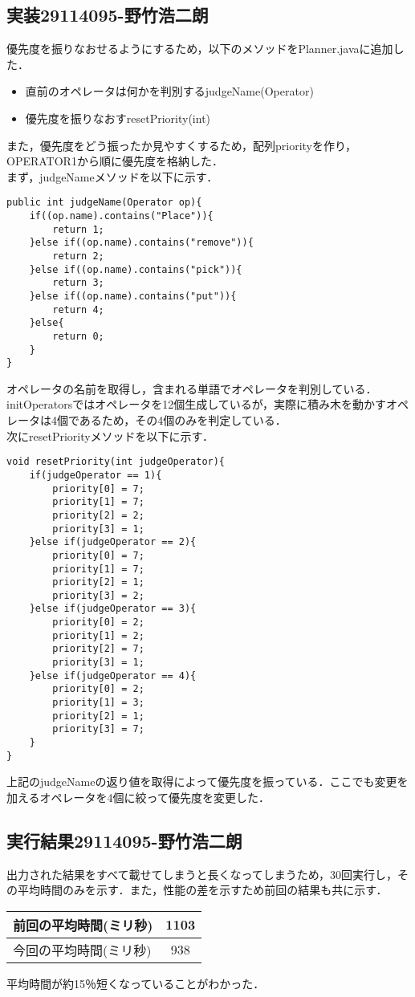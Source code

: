 \documentclass{jarticle}
\begin{document}
\subsection{実装29114095-野竹浩二朗}
優先度を振りなおせるようにするため，以下のメソッドをPlanner.javaに追加した．
\begin{itemize}
\item 直前のオペレータは何かを判別するjudgeName(Operator)
\item 優先度を振りなおすresetPriority(int)
\end{itemize}
また，優先度をどう振ったか見やすくするため，配列priorityを作り，OPERATOR1から順に優先度を格納した．\\
まず，judgeNameメソッドを以下に示す．
\begin{lstlisting}
public int judgeName(Operator op){
	if((op.name).contains("Place")){
		return 1;
	}else if((op.name).contains("remove")){
		return 2;
	}else if((op.name).contains("pick")){
		return 3;
	}else if((op.name).contains("put")){
		return 4;
	}else{
		return 0;
	}
}
\end{lstlisting}
オペレータの名前を取得し，含まれる単語でオペレータを判別している．initOperatorsではオペレータを12個生成しているが，実際に積み木を動かすオペレータは4個であるため，その4個のみを判定している．\\
次にresetPriorityメソッドを以下に示す．
\begin{lstlisting}
void resetPriority(int judgeOperator){
	if(judgeOperator == 1){
		priority[0] = 7;
		priority[1] = 7;
		priority[2] = 2;
		priority[3] = 1;
	}else if(judgeOperator == 2){
		priority[0] = 7;
		priority[1] = 7;
		priority[2] = 1;
		priority[3] = 2;
	}else if(judgeOperator == 3){
		priority[0] = 2;
		priority[1] = 2;
		priority[2] = 7;
		priority[3] = 1;
	}else if(judgeOperator == 4){
		priority[0] = 2;
		priority[1] = 3;
		priority[2] = 1;
		priority[3] = 7;
	}
}
\end{lstlisting}
上記のjudgeNameの返り値を取得によって優先度を振っている．ここでも変更を加えるオペレータを4個に絞って優先度を変更した．
\subsection{実行結果29114095-野竹浩二朗}
出力された結果をすべて載せてしまうと長くなってしまうため，30回実行し，その平均時間のみを示す．また，性能の差を示すため前回の結果も共に示す．
\begin{table}[H]
\begin{center}
\begin{tabular}{|l|c|}
\hline
前回の平均時間(ミリ秒) & 1103 \\ \hline
今回の平均時間(ミリ秒) & 938 \\ \hline
\end{tabular}
\end{center}
\end{table}
平均時間が約15％短くなっていることがわかった．
\end{document}

